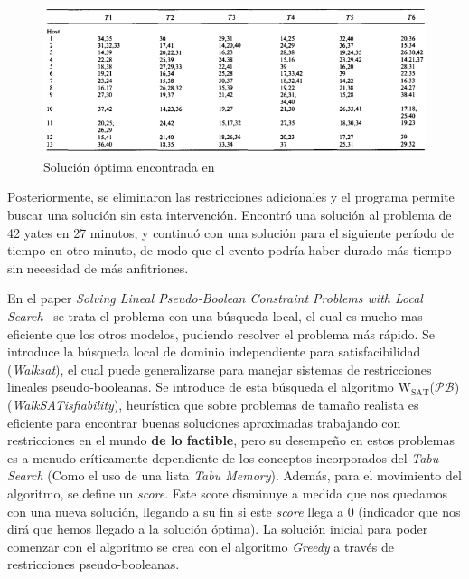 \documentclass[letter, 10pt]{article}
\begin{document}
\begin{itemize}
\begin{itemize}
\begin{figure}[h!]
\centering
 \includegraphics[width=1.0\textwidth]{party3.png}
 \caption{Solución óptima encontrada en ~\cite{Brailsford:1996:OSE:241748.241755}}
\end{figure}
\newpage
Posteriormente, se eliminaron las restricciones adicionales y el programa permite buscar una solución sin esta intervención. Encontró una solución al problema de 42 yates en 27 minutos, y continuó con una solución para el siguiente período de tiempo en otro minuto, de modo que el evento podría haber durado más tiempo sin necesidad de más anfitriones.
\end{itemize}
\end{itemize}

En el paper \textit{Solving Lineal Pseudo-Boolean Constraint Problems with Local Search}~\cite{Walser:1997:SLP:1867406.1867448} se trata el problema con una búsqueda local, el cual es mucho mas eficiente que los otros modelos, pudiendo resolver el problema más rápido. Se introduce la búsqueda local de dominio independiente para satisfacibilidad (\textit{Walksat}), el cual puede generalizarse para manejar sistemas de restricciones lineales pseudo-booleanas. Se introduce de esta búsqueda el algoritmo $\text{W}_{\text{SAT}}$($\mathcal{PB}$) (\textit{WalkSATisfiability}), heurística que sobre problemas de tamaño realista es eficiente para encontrar buenas soluciones aproximadas trabajando con restricciones en el mundo \textbf{de lo factible}, pero su desempeño en estos problemas es a menudo críticamente dependiente de los conceptos incorporados del \textit{Tabu Search} (Como el uso de una lista \textit{Tabu Memory}). Además, para el movimiento del algoritmo, se define un \textit{score}. Este score disminuye a medida que nos quedamos con una nueva solución, llegando a su fin si este \textit{score} llega a 0 (indicador que nos dirá que hemos llegado a la solución óptima). La solución inicial para poder comenzar con el algoritmo se crea con el algoritmo \textit{Greedy} a través de restricciones pseudo-booleanas.
\end{document}
